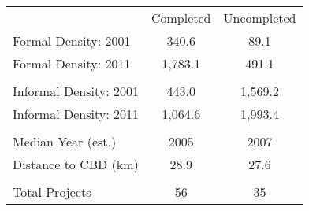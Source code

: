 \begin{tabu}{lcc}
 & Completed & Uncompleted \\ 
 Formal Density: 2001  & 340.6  & 89.1  \\ 
 Formal Density: 2011  & 1,783.1  & 491.1  \\ 
 &  &  \\ 
 Informal Density: 2001  & 443.0  & 1,569.2  \\ 
 Informal Density: 2011  & 1,064.6  & 1,993.4  \\ 
 &  &  \\ 
 Median Year (est.)  & 2005  & 2007  \\ 
 Distance to CBD (km)  & 28.9  & 27.6  \\ 
 &  &  \\ 
 Total Projects   & 56  & 35  \\ 
\bottomrule
\end{tabu}
